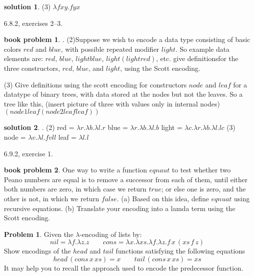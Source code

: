 \documentclass[10pt]{article}
\theoremstyle{definition}
\newtheorem{prob}{Problem}
\newtheorem{bp}{book problem}
\newtheorem{sol}{solution}
\begin{document}
\begin{sol}

  (3) $\lambda fxy.fyx$

\end{sol}

6.8.2, exercises 2--3.

\begin{bp}. \newline
  (2)Suppose we wish to encode a data type consisting of basic colors $red$ and $blue$, with possible repeated modifier $light$. So example data elements are: $red$, $blue$, $light blue$, $light(light red)$, etc. \newline
  give definitionsfor the three constructors, $red$, $blue$, and $light$, using the Scott encoding.

  (3) Give definitions using the scott encoding for constructors $node$ and $leaf$ for a datatype of binary trees, with data stored at the nodes but not the leaves. So a tree like this, (insert picture of three with values only in internal nodes) $(node 1 leaf(node 2 leaf leaf))$
\end{bp}

\begin{sol}. \newline
  (2) \newline
  red = $\lambda r. \lambda b. \lambda l. r$ \newline
  blue = $\lambda r. \lambda b. \lambda l. b$ \newline
  light = $\lambda c. \lambda r. \lambda b. \lambda l. lc$ \newline
  (3) \newline
  node = $\lambda v. \lambda l. f v l l$ \newline
  leaf = $ \lambda l.l$ 



\end{sol}

6.9.2, exercise 1.

\begin{bp}
 One way to write a function $eqnaut$ to test whether two Peano numbers are equal is to remove a successor from each of them, until either both numbers are zero, in which case we return $true$; or else one is zero, and the other is not, in which we return $false$.
 (a) Based on this idea, define $eqnuat$ using recursive equations.
 (b) Translate your encoding into a lamda term using the Scott encoding. 
\end{bp}

\begin{prob}
  Given the $\lambda$-encoding of lists by:
  \[
    nil = \lambda f. \lambda z. z \qquad cons = \lambda x. \lambda xs. \lambda f. \lambda z. f\,x\,(xs\,f\,z)
  \]
  Show encodings of the $head$ and $tail$ functions satisfying the following equations
  \[
    head\,(cons\,x\,xs) = x \qquad tail\,(cons\,x\,xs) = xs
  \]
  It may help you to recall the approach used to encode the predecessor function.
\end{prob}
\end{document}
